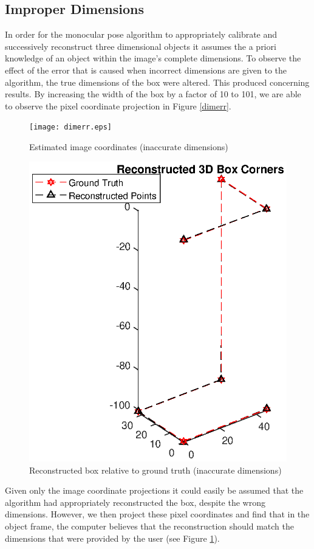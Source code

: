 \documentclass[12pt]{article}
\begin{document}
\subsection{Improper Dimensions}
In order for the monocular pose algorithm to appropriately calibrate and successively reconstruct three dimensional objects it assumes the a priori knowledge of an object within the image's complete dimensions. To observe the effect of the error that is caused when incorrect dimensions are given to the algorithm, the true dimensions of the box were altered. This produced concerning results. By increasing the width of the box by a factor of 10 to 101, we are able to observe the pixel coordinate projection in Figure \ref{dimerr}. 
\begin{figure}[h]
	\centering %
	\captionsetup{justification=centering}
	\begin{minipage}{0.5\textwidth}
		\centering
		\texttt{[image: dimerr.eps]}
		\caption{Estimated image coordinates (inaccurate dimensions)} \label{dimerr}
	\end{minipage}\hfill
	\begin{minipage}{0.5\textwidth}
		\centering %
		\includegraphics[width=1\textwidth]{dimerr_recon.eps}
		\caption{Reconstructed box relative to ground truth (inaccurate dimensions)} \label{dimerrrecon}
	\end{minipage}
\end{figure}
Given only the image coordinate projections it could easily be assumed that the algorithm had appropriately reconstructed the box, despite the wrong dimensions. However, we then project these pixel coordinates and find that in the object frame, the computer believes that the reconstruction should match the dimensions that were provided by the user (see Figure \ref{dimerrrecon}). 
\end{document}
